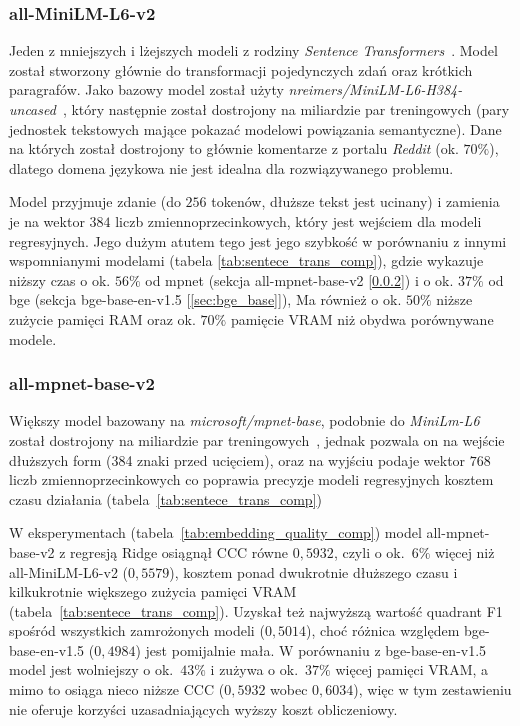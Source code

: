 \subsubsection{all-MiniLM-L6-v2}
\label{sec:all_miniml}
Jeden z mniejszych i lżejszych modeli z rodziny 
\textit{Sentence Transformers}~\cite{all_MiniLM_L6_v2}. Model został stworzony głównie do 
transformacji pojedynczych zdań oraz krótkich paragrafów. Jako bazowy model został użyty 
\textit{nreimers/MiniLM-L6-H384-uncased}~\cite{wang2020minilm}, który następnie został 
dostrojony na miliardzie par treningowych (pary jednostek tekstowych mające pokazać modelowi 
powiązania semantyczne). Dane na których został dostrojony to głównie komentarze z portalu 
\textit{Reddit} (ok. $70\%$), dlatego domena językowa nie jest idealna dla rozwiązywanego problemu.

Model przyjmuje zdanie (do $256$ tokenów, dłuższe tekst jest ucinany) i zamienia je
na wektor $384$ liczb zmiennoprzecinkowych, który jest wejściem dla modeli
regresyjnych. Jego dużym atutem tego jest jego szybkość w porównaniu z innymi wspomnianymi 
modelami (tabela \ref{tab:sentece_trans_comp}), gdzie wykazuje niższy czas o ok. $56\%$ od mpnet 
(sekcja all-mpnet-base-v2 [\ref{sec:all_mpnet}]) i o ok. $37\%$ od bge (sekcja bge-base-en-v1.5 [\ref{sec:bge_base}]), Ma również o ok. $50\%$ niższe zużycie pamięci RAM oraz ok. $70\%$ pamięcie VRAM 
niż obydwa porównywane modele. 

\subsubsection{all-mpnet-base-v2}
\label{sec:all_mpnet}
Większy model bazowany na \textit{microsoft/mpnet-base}, podobnie do \textit{MiniLm-L6} został
dostrojony na miliardzie par treningowych~\cite{mpnet}, jednak pozwala on na wejście dłuższych form 
(384 znaki przed ucięciem), oraz na wyjściu podaje wektor $768$ liczb zmiennoprzecinkowych co 
poprawia precyzje modeli regresyjnych kosztem czasu działania (tabela~\ref{tab:sentece_trans_comp})

W eksperymentach (tabela~\ref{tab:embedding_quality_comp}) model
all-mpnet-base-v2 z regresją Ridge osiągnął CCC równe $0{,}5932$, czyli
o ok.\ $6\%$ więcej niż all-MiniLM-L6-v2 ($0{,}5579$), kosztem ponad
dwukrotnie dłuższego czasu i kilkukrotnie większego zużycia pamięci VRAM
(tabela~\ref{tab:sentece_trans_comp}). Uzyskał też najwyższą wartość
quadrant F1 spośród wszystkich zamrożonych modeli ($0{,}5014$), choć różnica
względem bge-base-en-v1.5 ($0{,}4984$) jest pomijalnie mała. W porównaniu z bge-base-en-v1.5 model 
jest wolniejszy o ok.\ $43\%$ i zużywa o ok.\ $37\%$ więcej pamięci VRAM, a mimo to osiąga
nieco niższe CCC ($0{,}5932$ wobec $0{,}6034$), więc w tym zestawieniu
nie oferuje korzyści uzasadniających wyższy koszt obliczeniowy.


